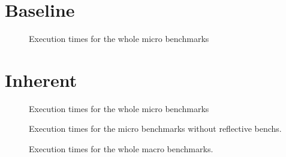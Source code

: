 \documentclass[12pt]{article}
\begin{document}
\section{Baseline}

\begin{figure}[ht]
\begin{center}
\LanguagesPerfComparisonPlot
\end{center}
\vspace*{-5pt}
\caption{Execution times for the whole micro benchmarks}
\label{fig:perf-overview}
\end{figure}

\LanguagesTableSummary

\LanguagesTableOverall


\section{Inherent}

\begin{figure}[ht]
\begin{center}
\MicroPerfComparisonPlot
\end{center}
\vspace*{-5pt}
\caption{Execution times for the whole micro benchmarks}
\label{fig:perf-overview}
\end{figure}

\MicroTableSummary

\MicroTableOverall


\begin{figure}[ht]
\begin{center}
\MicroWithoutRecursivePerfComparisonPlot
\end{center}
\vspace*{-5pt}
\caption{Execution times for the micro benchmarks without reflective benchs.}
\label{fig:perf-overview}
\end{figure}

\MicroWithoutRecursiveTableSummary

\MicroWithoutRecursiveTableOverall


\begin{figure}[ht]
\begin{center}
\MacroPerfComparisonPlot
\end{center}
\vspace*{-5pt}
\caption{Execution times for the whole macro benchmarks.}
\label{fig:perf-overview}
\end{figure}

\MacroTableSummary
\end{document}
